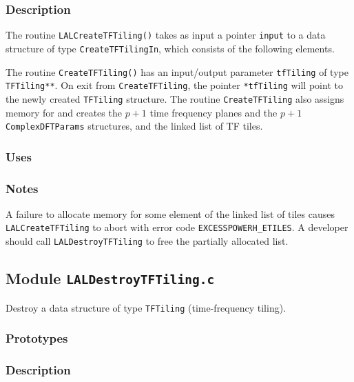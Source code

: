 \subsubsection*{Description}

The routine \verb+LALCreateTFTiling()+ takes as input a pointer \verb+input+
to a data structure of type \verb+CreateTFTilingIn+, which consists of the
following elements.

The routine \verb+CreateTFTiling()+ has an input/output parameter
\verb+tfTiling+ of type \verb+TFTiling**+.  On exit from
\verb+CreateTFTiling+, the pointer \verb+*tfTiling+ will point to the newly
created \verb+TFTiling+ structure.  The routine \verb+CreateTFTiling+ also
assigns memory for and creates the $p+1$ time frequency planes and the $p+1$
\verb+ComplexDFTParams+ structures, and the linked list of TF tiles.

\subsubsection*{Uses}

\subsubsection*{Notes}
A failure to allocate memory for some element of the linked list of tiles
causes \verb+LALCreateTFTiling+ to abort with error code
\verb+EXCESSPOWERH_ETILES+.  A developer should call \verb+LALDestroyTFTiling+
to free the partially allocated list.   

\vfill{\footnotesize}

\newpage
\subsection{Module \texttt{LALDestroyTFTiling.c}}
\label{ss:LALDestroyTFTiling.c}

Destroy a data structure of type \verb+TFTiling+ (time-frequency tiling).

\subsubsection*{Prototypes}
\vspace{0.1in}


\subsubsection*{Description}

